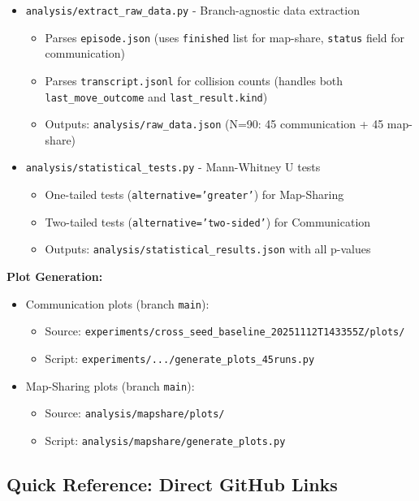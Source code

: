 \documentclass[11pt]{article}
\begin{document}
\begin{itemize}
    \item \texttt{analysis/extract\_raw\_data.py} - Branch-agnostic data extraction
    \begin{itemize}
        \item Parses \texttt{episode.json} (uses \texttt{finished} list for map-share, \texttt{status} field for communication)
        \item Parses \texttt{transcript.jsonl} for collision counts (handles both \texttt{last\_move\_outcome} and \texttt{last\_result.kind})
        \item Outputs: \texttt{analysis/raw\_data.json} (N=90: 45 communication + 45 map-share)
    \end{itemize}
    \item \texttt{analysis/statistical\_tests.py} - Mann-Whitney U tests
    \begin{itemize}
        \item One-tailed tests (\texttt{alternative='greater'}) for Map-Sharing
        \item Two-tailed tests (\texttt{alternative='two-sided'}) for Communication
        \item Outputs: \texttt{analysis/statistical\_results.json} with all p-values
    \end{itemize}
\end{itemize}

\textbf{Plot Generation:}
\begin{itemize}
    \item Communication plots (branch \texttt{main}):
    \begin{itemize}
        \item Source: \texttt{experiments/cross\_seed\_baseline\_20251112T143355Z/plots/}
        \item Script: \texttt{experiments/.../generate\_plots\_45runs.py}
    \end{itemize}
    \item Map-Sharing plots (branch \texttt{main}):
    \begin{itemize}
        \item Source: \texttt{analysis/mapshare/plots/}
        \item Script: \texttt{analysis/mapshare/generate\_plots.py}
    \end{itemize}
\end{itemize}

\subsection{Quick Reference: Direct GitHub Links}
\end{document}
